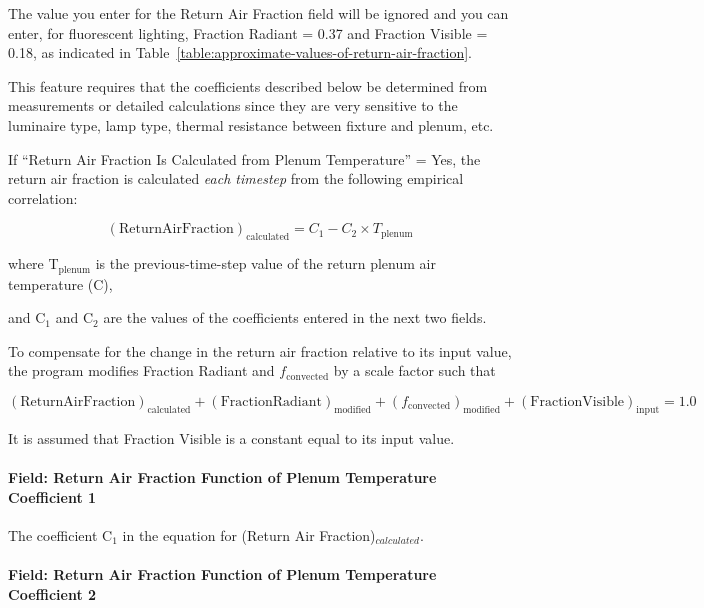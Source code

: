 The value you enter for the Return Air Fraction field will be ignored and you can enter, for fluorescent lighting, Fraction Radiant = 0.37 and Fraction Visible = 0.18, as indicated in Table~\ref{table:approximate-values-of-return-air-fraction}.

This feature requires that the coefficients described below be determined from measurements or detailed calculations since they are very sensitive to the luminaire type, lamp type, thermal resistance between fixture and plenum, etc.

If ``Return Air Fraction Is Calculated from Plenum Temperature'' = Yes, the return air fraction is calculated \emph{each timestep} from the following empirical correlation:

\begin{equation}
  (\mathrm{Return Air Fraction})_{\mathrm{calculated}} = C_{1} - C_{2} \times T_{\mathrm{plenum}}
\end{equation}

where T\(_{\mathrm{plenum}}\) is the previous-time-step value of the return plenum air temperature (C),

and C\(_{1}\) and C\(_{2}\) are the values of the coefficients entered in the next two fields.

To compensate for the change in the return air fraction relative to its input value, the program modifies Fraction Radiant and \(f_{\mathrm{convected}}\) by a scale factor such that

\begin{equation}
  (\mathrm{Return Air Fraction})_{\mathrm{calculated}} + (\mathrm{Fraction Radiant})_{\mathrm{modified}} + (f_{\mathrm{convected}})_{\mathrm{modified}} + (\mathrm{Fraction Visible})_{\mathrm{input}} = 1.0
\end{equation}

It is assumed that Fraction Visible is a constant equal to its input value.

\paragraph{Field: Return Air Fraction Function of Plenum Temperature Coefficient 1}\label{field-return-air-fraction-function-of-plenum-temperature-coefficient-1}

The coefficient C\(_{1}\) in the equation for (Return Air Fraction)\(_{calculated}\).

\paragraph{Field: Return Air Fraction Function of Plenum Temperature Coefficient 2}\label{field-return-air-fraction-function-of-plenum-temperature-coefficient-2}

